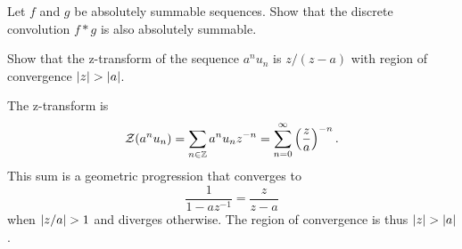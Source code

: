 \begin{excersizelist}
\item \label{exer:convabssummableisabssummable}  Let $f$ and $g$ be absolutely summable sequences.  Show that the discrete convolution $f * g$ is also absolutely summable.  

\item \label{exer:stepseqZtrans} Show that the z-transform of the sequence  $a^nu_n$ is $z/(z-a)$ with region of convergence $\left\vert z \right\vert > \left\vert a \right\vert$.
\begin{solution}
The z-transform is
\[
{\mathcal Z}(a^nu_n) = \sum_{n \in {\mathbb Z}} a^n u_n z^{-n} = \sum_{n=0}^\infty \left(\frac{z}{a}\right)^{-n}.
\]
This sum is a geometric progression that converges to 
\[
\frac{1}{1- a z^{-1}} = \frac{z}{ z-a}
\]
when $\left\vert z/a \right\vert > 1$ and diverges otherwise.  The region of convergence is thus $\left\vert z \right\vert > \left\vert a \right\vert$.
\end{solution}


\end{excersizelist}

